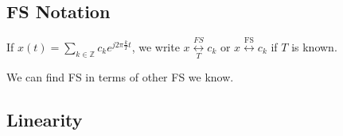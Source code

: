 \subsection{FS Notation}
\begin{definition}
    If \( x(t) = \sum_{k \in \mathbb{Z}} c_k e^{j 2\pi \frac{k}{T} t} \), we write \( x \underset{T}{\overset{FS}{\longleftrightarrow}} c_k \) or \( x \overset{\text{FS}}{\longleftrightarrow} c_k \) if \( T \) is known.
\end{definition}

\begin{warning}
    We can find FS in terms of other FS we know. 
\end{warning}

\subsection{Linearity}
